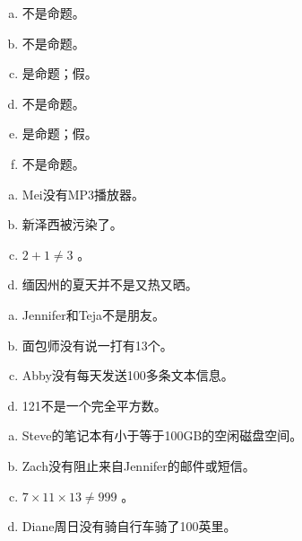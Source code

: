 {{        %
        \begin{practices}
            \begin{enumerate}[a)]
                \item 不是命题。
                \item 不是命题。
                \item 是命题；假。
                \item 不是命题。
                \item 是命题；假。
                \item 不是命题。
            \end{enumerate}
        \end{practices}

        \begin{practices}
            \begin{enumerate}[a)]
                \item Mei没有MP3播放器。
                \item 新泽西被污染了。
                \item $2 + 1 \neq 3$ 。
                \item 缅因州的夏天并不是又热又晒。
            \end{enumerate}
        \end{practices}

        \begin{practices}
            \begin{enumerate}[a)]
                \item Jennifer和Teja不是朋友。
                \item 面包师没有说一打有13个。
                \item Abby没有每天发送100多条文本信息。
                \item 121不是一个完全平方数。
            \end{enumerate}
        \end{practices}

        \begin{practices}
            \begin{enumerate}[a)]
                \item Steve的笔记本有小于等于100GB的空闲磁盘空间。
                \item Zach没有阻止来自Jennifer的邮件或短信。
                \item $7 \times 11 \times 13 \neq 999$ 。
                \item Diane周日没有骑自行车骑了100英里。
            \end{enumerate}
        \end{practices}

}}
